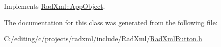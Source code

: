 Implements \hyperlink{class_rad_xml_1_1_app_object_a677e0af301973343665699f6d07f2018}{Rad\-Xml\-::\-App\-Object}.



The documentation for this class was generated from the following file\-:\begin{DoxyCompactItemize}
\item 
C\-:/editing/c/projects/radxml/include/\-Rad\-Xml/\hyperlink{_rad_xml_button_8h}{Rad\-Xml\-Button.\-h}\end{DoxyCompactItemize}
